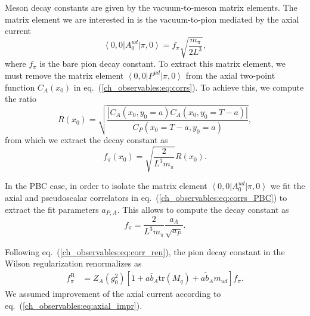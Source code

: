 Meson decay constants are given by the vacuum-to-meson matrix elements. The matrix element we are interested in is the vacuum-to-pion mediated by the axial current
\begin{equation}
\label{ch_observables:eq:axial_matrix_element}
\left<0,0\right|A_0^{ud}\left|\pi,0\right>=f_{\pi}\sqrt{\frac{m_{\pi}}{2L^3}},
\end{equation}
where $f_{\pi}$ is the bare pion decay constant. To extract this matrix element, we must remove the matrix element $\left<0,0\right|P^{ud}\left|\pi,0\right>$ from the axial two-point function $C_A(x_0)$ in eq.~(\ref{ch_observables:eq:corrs}). To achieve this, we compute the ratio
\begin{equation}
\label{ch_observables:eq:R}
R(x_0)=\sqrt{\frac{\left|C_A(x_0,y_0=a)C_A(x_0,y_0=T-a)\right|}{C_P(x_0=T-a,y_0=a)}},
\end{equation}
from which we extract the decay constant as
\begin{equation}
f_{\pi}(x_0)=\sqrt{\frac{2}{L^3m_{\pi}}}R(x_0).
\end{equation}

In the PBC case, in order to isolate the matrix element $\left<0,0\right|A_0^{ud}\left|\pi,0\right>$ we fit the axial and pseudoscalar correlators in eq.~(\ref{ch_observables:eq:corrs_PBC}) to extract the fit parameters $a_{P,A}$. This allows to compute the decay constant as
\begin{equation}
f_{\pi}=\frac{2}{L^3m_{\pi}}\frac{a_A}{\sqrt{a_P}}.
\end{equation}

Following eq.~(\ref{ch_observables:eq:corr_ren}), the pion decay constant in the Wilson regularization renormalizes as
\begin{align}
f_{\pi}^{\textrm{R}}&=Z_A(g_0^2)\left[1+a\bar{b}_A{\textrm{tr}}\left(M_q\right)+a\tilde{b}_Am_{ud}\right]f_{\pi}.
\end{align}
We assumed improvement of the axial current according to eq.~(\ref{ch_observables:eq:axial_impr}).

